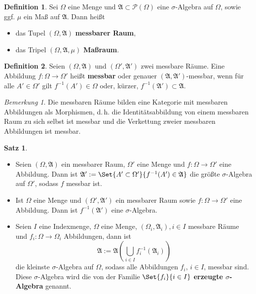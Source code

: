 \documentclass[a4paper,10pt,landscape]{article}
\newcommand{\PS}{\mathcal{P}} %
\newcommand{\PSO}{\PS(\Omega)} %
\newcommand{\Alg}{\mathfrak{A}}
\theoremstyle{definition}
\newtheorem*{defn}{Definition}
\newtheorem*{satz}{Satz}
\theoremstyle{remark}
\newtheorem*{bem}{Bemerkung}
\renewcommand{\emph}[1]{\textcolor{Emph}{\bf{#1}}}
\begin{document}
\begin{multicols}{3}
\begin{defn}
  Sei $\Omega$ eine Menge und $\Alg \subset \PSO$ eine $\sigma$-Algebra auf $\Omega$, sowie ggf. $\mu$ ein Maß auf $\Alg$. Dann heißt
  \begin{itemize}
    \item das Tupel $(\Omega, \Alg)$ \emph{messbarer Raum},
    \item das Tripel $(\Omega, \Alg, \mu)$ \emph{Maßraum}.
  \end{itemize}
\end{defn}

\begin{defn}
  Seien $(\Omega, \Alg)$ und $(\Omega', \Alg')$ zwei messbare Räume. Eine Abbildung $f : \Omega \to \Omega'$ heißt \emph{messbar} oder genauer $(\Alg, \Alg')$-messbar, wenn für alle $A' \in \Omega'$ gilt $f^{-1}(A') \in \Omega$ oder, kürzer, $f^{-1}(\Alg') \subset \Alg$.
\end{defn}

\begin{bem}
  Die messbaren Räume bilden eine Kategorie mit messbaren Abbildungen als Morphismen, d.\,h. die Identitätsabbildung von einem messbaren Raum zu sich selbst ist messbar und die Verkettung zweier messbaren Abbildungen ist messbar.
\end{bem}

\begin{satz}
  \begin{itemize}
    \item Seien $(\Omega, \Alg)$ ein messbarer Raum, $\Omega'$ eine Menge und $f : \Omega \to \Omega'$ eine Abbildung. Dann ist $\Alg' := \Set{ A' \subset \Omega' }{ f^{-1}(A') \in \Alg }$ die größte $\sigma$-Algebra auf $\Omega'$, sodass $f$ messbar ist.
    \item Ist $\Omega$ eine Menge und $(\Omega', \Alg')$ ein messbarer Raum sowie $f : \Omega \to \Omega'$ eine Abbildung. Dann ist $f^{-1}(\Alg')$ eine $\sigma$-Algebra.
    \item Seien $I$ eine Indexmenge, $\Omega$ eine Menge, $(\Omega_i, \Alg_i), i \in I$ messbare Räume und $f_i : \Omega \to \Omega_i$ Abbildungen, dann ist
    \[ \Alg := \Alg\left( \bigcup_{i \in I} f_i^{-1}(\Alg_i) \right) \]
    die kleinste $\sigma$-Algebra auf $\Omega$, sodass alle Abbildungen $f_i$, $i \in I$, messbar sind. Diese $\sigma$-Algebra wird die von der Familie $\Set{ f_i }{i \in I}$ \emph{erzeugte $\sigma$-Algebra} genannt.
  \end{itemize}
\end{satz}


\end{multicols}
\end{document}
